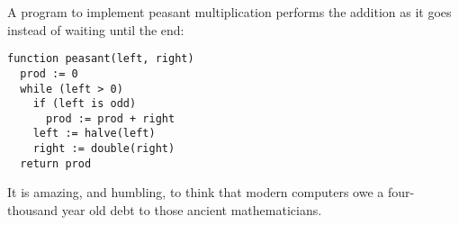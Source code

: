 \documentclass{article}
\begin{document}
\begin{small}
A program to implement peasant multiplication performs the addition as it goes instead of wait­ing until the end:

\begin{footnotesize}\begin{verbatim}
function peasant(left, right)
  prod := 0
  while (left > 0)
    if (left is odd)
      prod := prod + right
    left := halve(left)
    right := double(right)
  return prod
\end{verbatim}\end{footnotesize}

It is amazing, and humbling, to think that mod­ern computers owe a four-thousand year old debt to those ancient mathematicians.

\end {small} 
\end{document}
